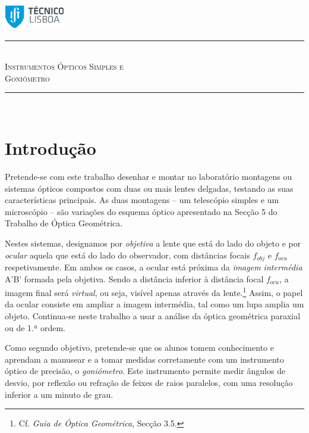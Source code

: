 \documentclass[a4paper,12pt]{article}      %
\author{Prof. Bernardo B. Carvalho}
\date{ Outubro 2012}
\newcommand{\HRule}{\rule{\linewidth}{0.5mm}}
\begin{document}
 

	\includegraphics[width=0.2\textwidth]{../../logo-ist}%

	\HRule \\[0.5cm]
	{ \huge \sf  \textsc{Instrumentos Ópticos Simples e \\ Goniómetro}} \\[0.4cm] %
	\HRule \\%

\section{\sf Introdução}
Pretende-se com este trabalho desenhar e montar no laboratório montagens ou sistemas ópticos compostos com duas ou mais lentes delgadas, testando as suas características principais. As duas montagens -- um telescópio simples e um microscópio -- são variações do esquema óptico apresentado na Secção 5 do Trabalho de Óptica Geométrica. 

Nestes sistemas, designamos por \emph{objetiva} a lente que está do lado do objeto e por \emph{ocular} aquela que está do lado do observador, com distâncias focais $f_{obj}$ e $f_{ocu}$ respetivamente. Em ambos os casos, a ocular está  próxima da \emph{imagem intermédia} A'B' formada pela objetiva. Sendo a distância inferior à distância focal $f_{ocu}$, a imagem final será \emph{virtual}, ou seja, visível apenas através da lente.\footnote{Cf. \emph{Guia de Óptica Geométrica}, Secção 3.5.}
Assim, o papel da ocular consiste em ampliar a imagem intermédia, tal como um lupa amplia um objeto.
 Continua-se neste trabalho a usar a análise da óptica geométrica paraxial ou de 1.ª ordem.


Como segundo objetivo, pretende-se que os alunos tomem conhecimento e aprendam a manusear e a tomar medidas corretamente  com um instrumento óptico de precisão, o \emph{goniómetro}. Este instrumento permite medir ângulos de desvio, por reflexão ou refração de feixes de raios paralelos, com uma resolução inferior a um minuto de grau.
\end{document}
